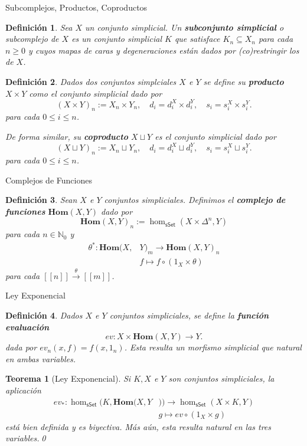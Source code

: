 \documentclass[11pt]{beamer}
\newcommand{\N}{\mathbb{N}}
\newcommand{\nat}[1]{[\![#1]\!]}
\newcommand{\ord}[1]{\nat{#1}}
\newcommand{\cat}[1]{\mathsf{#1}}
\renewcommand{\ss}[1]{\Delta^{#1}}
\newcommand{\homcomplex}{\mathbf{Hom}}
\newtheorem{defs}{Definición}
\newtheorem{teo}{Teorema}
\begin{document}
\begin{frame}{Subcomplejos, Productos, Coproductos}

\begin{defs} Sea $X$ un conjunto simplicial. Un \textbf{subconjunto simplicial} o subcomplejo de $X$ es un conjunto simplicial $K$ que satisface $K_n \subseteq X_n$ para cada $n \geq 0$ y cuyos mapas de caras y degeneraciones están dados por (co)restringir los de $X$.
\end{defs}

\begin{defs} Dados dos conjuntos simplciales $X$ e $Y$ se define su \textbf{producto} $X \times Y$ como el conjunto simplicial dado por
\[
(X \times Y)_n := X_n \times Y_n, \quad d_i = d_i^X \times d_i^Y, \quad s_i = s_i^X \times s_i^Y.
\]
para cada $0 \leq i \leq n$.

De forma similar, su \textbf{coproducto} $X \sqcup Y$ es el conjunto simplicial dado por
\[
(X \sqcup Y)_n := X_n \sqcup Y_n, \quad d_i = d_i^X \sqcup d_i^Y, \quad s_i = s_i^X \sqcup s_i^Y.
\]
para cada $0 \leq i \leq n$.
\end{defs}
\end{frame}

\begin{frame}{Complejos de Funciones}
\begin{defs} Sean $X$ e $Y$ conjuntos simpliciales. Definimos el \textbf{complejo de funciones} $\homcomplex(X,Y)$ dado por
\[
\homcomplex(X,Y)_n := \hom_{\cat{sSet}}(X \times \ss{n},Y)
\]
para cada $n \in \N_0$ y 
\begin{align*}
\theta^* : \homcomplex(X,&Y)_m \to \homcomplex(X,Y)_n \\
&f \longmapsto f \circ (1_X \times \theta)
\end{align*}
para cada $\ord{n} \xrightarrow{\theta} \ord{m}$.
\end{defs}
\end{frame}

\begin{frame}{Ley Exponencial}
\begin{defs} Dados $X$ e $Y$ conjuntos simpliciales, se define la \textbf{función evaluación}
\[
ev : X \times \homcomplex(X,Y) \to Y.
\]
dada por $ev_n(x,f) = f(x,1_n)$. Esta resulta un morfismo simplicial que natural en ambas variables.
\end{defs}

\begin{teo}[Ley Exponencial] Si $K,X$ e $Y$ son conjuntos simpliciales, la aplicación
\begin{align*}
ev_* : \hom_{\cat{sSet}}(K,\homcomplex(X,Y&)) \to \hom_{\cat{sSet}}(X \times K,Y)\\
&g \longmapsto ev \circ (1_X \times g)
\end{align*}
está bien definida y es biyectiva. Más aún, esta resulta natural en las tres variables.\qed
\end{teo}
\end{frame}
\end{document}
